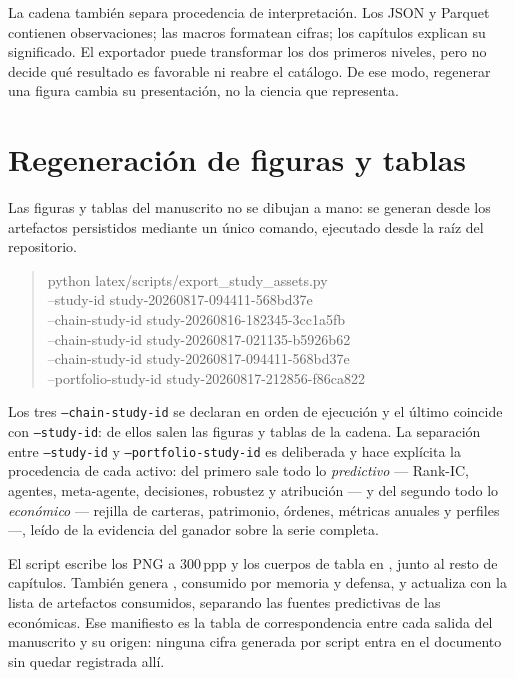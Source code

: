 La cadena también separa procedencia de interpretación. Los JSON y Parquet contienen observaciones;
las macros formatean cifras; los capítulos explican su significado. El exportador puede transformar
los dos primeros niveles, pero no decide qué resultado es favorable ni reabre el catálogo. De ese
modo, regenerar una figura cambia su presentación, no la ciencia que representa.

\section{Regeneración de figuras y tablas}

Las figuras y tablas del manuscrito no se dibujan a mano: se generan desde los artefactos
persistidos mediante un único comando, ejecutado desde la raíz del repositorio.

\begin{quote}
\ttfamily
python latex/scripts/export\_study\_assets.py \\
\hspace*{2em}--study-id study-20260817-094411-568bd37e \\
\hspace*{2em}--chain-study-id study-20260816-182345-3cc1a5fb \\
\hspace*{2em}--chain-study-id study-20260817-021135-b5926b62 \\
\hspace*{2em}--chain-study-id study-20260817-094411-568bd37e \\
\hspace*{2em}--portfolio-study-id study-20260817-212856-f86ca822
\end{quote}

Los tres \texttt{--chain-study-id} se declaran en orden de ejecución y el último coincide con
\texttt{--study-id}: de ellos salen las figuras y tablas de la cadena. La separación entre
\texttt{--study-id} y \texttt{--portfolio-study-id} es deliberada y hace explícita la procedencia de
cada activo: del primero sale todo lo \emph{predictivo} --- Rank-IC, agentes, meta-agente,
decisiones, robustez y atribución --- y del segundo todo lo \emph{económico} --- rejilla de
carteras, patrimonio, órdenes, métricas anuales y perfiles ---, leído de la evidencia del ganador
sobre la serie completa.

El script escribe los PNG a 300\,ppp y los cuerpos de tabla en , junto al
resto de capítulos. También genera , consumido por memoria y defensa,
y actualiza  con la lista de
artefactos consumidos, separando las fuentes predictivas de las económicas. Ese manifiesto es la
tabla de correspondencia entre cada salida del manuscrito y su origen: ninguna cifra generada por
script entra en el documento sin quedar registrada allí.

